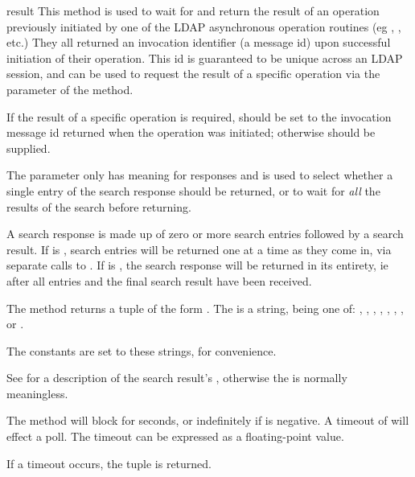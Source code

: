 \begin{methoddesc}[tuple]{result}{}
This method is used to wait for and return the result of an operation
previously initiated by one of the LDAP asynchronous operation routines
(eg , , etc.) They all returned
an invocation identifier (a message id) upon successful initiation of
their operation. This id is guaranteed to be unique across an LDAP session,
and can be used to request the result of a specific operation via the
 parameter of the  method.

If the result of a specific operation is required,  should
be set to the invocation message id returned when the operation was
initiated; otherwise  should be supplied. 

The 
parameter only has meaning for  responses and is used to select 
whether a single entry of the search response should be returned, or to
wait for \emph{all} the results of the search before returning. 

A search response is made up of zero or more search entries followed by
a search result. If  is , search entries will be returned one
at a time as they come in, via separate calls to . If
 is , the search response will be returned in its 
entirety, ie after all entries and the final search result have been
received.

The method returns a tuple of the form 
.
The  is a string, being one of:
, ,
, 
, , , 
, or .

The constants  are set to these strings, for convenience.

See  for a description of the search result's ,
otherwise the  is normally meaningless.

The  method will block for  seconds, or 
indefinitely if  is negative. 
A timeout of  will effect a poll. 
The timeout can be expressed as a floating-point value.

If a timeout occurs, the tuple  is returned.

\end{methoddesc}

